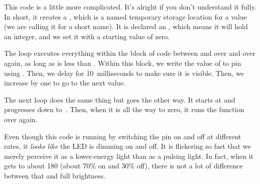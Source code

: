 This code is a little more complicated.
It's alright if you don't understand it fully.
In short, it creates a , which is a named temporary storage location for a value (we are calling it  for a short name).
It is declared an , which means it will hold an integer, and we set it with a starting value of zero.

The  loop executes everything within the block of code between \icode{\{} and \icode{\}} over and over again, as long as  is less than .
Within this block, we write the value of  to pin  using .
Then, we delay for 10~milliseconds to make sure it is visible.
Then, we increase  by one to go to the next value.

The next  loop does the same thing but goes the other way.
It starts at  and progresses down to~.
Then, when it is all the way to zero, it runs the  function over again.

Even though this code is running by switching the pin on and off at different rates, it \emph{looks like} the LED is dimming on and off.
It is flickering so fast that we merely perceive it as a lower-energy light than as a pulsing light.
In fact, when it gets to about 180 (about 70\% on and 30\% off), there is not a lot of difference between that and full brightness.
